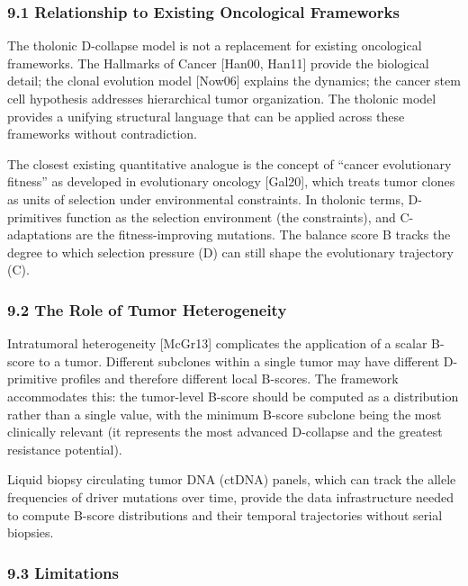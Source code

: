 \documentclass[
  11pt,
  letterpaper,
]{article}
\begin{document}
\subsubsection{9.1 Relationship to Existing Oncological
Frameworks}\label{relationship-to-existing-oncological-frameworks}

The tholonic D-collapse model is not a replacement for existing
oncological frameworks. The Hallmarks of Cancer {[}Han00, Han11{]}
provide the biological detail; the clonal evolution model {[}Now06{]}
explains the dynamics; the cancer stem cell hypothesis addresses
hierarchical tumor organization. The tholonic model provides a unifying
structural language that can be applied across these frameworks without
contradiction.

The closest existing quantitative analogue is the concept of ``cancer
evolutionary fitness'' as developed in evolutionary oncology
{[}Gal20{]}, which treats tumor clones as units of selection under
environmental constraints. In tholonic terms, D-primitives function as
the selection environment (the constraints), and C-adaptations are the
fitness-improving mutations. The balance score B tracks the degree to
which selection pressure (D) can still shape the evolutionary trajectory
(C).

\subsubsection{9.2 The Role of Tumor
Heterogeneity}\label{the-role-of-tumor-heterogeneity}

Intratumoral heterogeneity {[}McGr13{]} complicates the application of a
scalar B-score to a tumor. Different subclones within a single tumor may
have different D-primitive profiles and therefore different local
B-scores. The framework accommodates this: the tumor-level B-score
should be computed as a distribution rather than a single value, with
the minimum B-score subclone being the most clinically relevant (it
represents the most advanced D-collapse and the greatest resistance
potential).

Liquid biopsy circulating tumor DNA (ctDNA) panels, which can track the
allele frequencies of driver mutations over time, provide the data
infrastructure needed to compute B-score distributions and their
temporal trajectories without serial biopsies.

\subsubsection{9.3 Limitations}\label{limitations}
\end{document}
